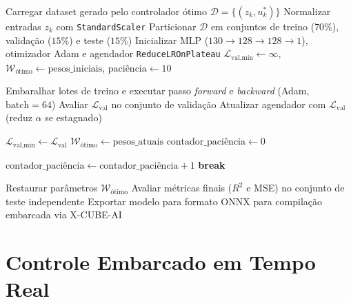 \begin{algorithm}[H]
\caption{Treinamento da Rede Neural para Aproximação do Controlador}
\label{alg:treino_mlp}
\begin{algorithmic}[1]


    \State Carregar dataset gerado pelo controlador ótimo $\mathcal{D} = \{(z_k, u_k^*)\}$
    \State Normalizar entradas $z_k$ com \texttt{StandardScaler}
    \State Particionar $\mathcal{D}$ em conjuntos de treino ($70\%$), validação ($15\%$) e teste ($15\%$)
    \State Inicializar MLP ($130 \to 128 \to 128 \to 1$), otimizador Adam e agendador \texttt{ReduceLROnPlateau}
    \State $\mathcal{L}_{\text{val,min}} \gets \infty$, \quad $\mathcal{W}_{\text{ótimo}} \gets \text{pesos\_iniciais}$, \quad $\text{paciência} \gets 10$

    \Statex
        \State Embaralhar lotes de treino e executar passo \textit{forward} e \textit{backward} (Adam, $\text{batch}=64$)
        \State Avaliar $\mathcal{L}_{\text{val}}$ no conjunto de validação
        \State Atualizar agendador com $\mathcal{L}_{\text{val}}$ (reduz $\alpha$ se estagnado)

            \State $\mathcal{L}_{\text{val,min}} \gets \mathcal{L}_{\text{val}}$
            \State $\mathcal{W}_{\text{ótimo}} \gets \text{pesos\_atuais}$
            \State $\text{contador\_paciência} \gets 0$
            
        \Else
            \State $\text{contador\_paciência} \gets \text{contador\_paciência} + 1$
                \State \textbf{break} 
            \EndIf
        \EndIf
    \EndFor

    \Statex
    \State Restaurar parâmetros $\mathcal{W}_{\text{ótimo}}$
    \State Avaliar métricas finais ($R^2$ e MSE) no conjunto de teste independente
    \State Exportar modelo para formato ONNX para compilação embarcada via X-CUBE-AI

\EndProcedure
\end{algorithmic}
\end{algorithm}

\section{Controle Embarcado em Tempo Real}
\label{sec:embarcado}

